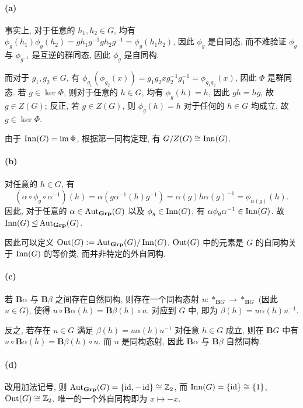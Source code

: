 \documentclass{article}
\begin{document}
\begin{solution}
	\paragraph{(a)} 事实上, 对于任意的 $h_1,h_2 \in G$, 均有 $\phi_g(h_1) \phi_g(h_2) = gh_1g^{-1} gh_2g^{-1} = \phi_g(h_1h_2)$, 因此 $\phi_g$ 是自同态, 而不难验证 $\phi_g$ 与 $\phi_{g^{-1}}$ 是互逆的群同态, 因此 $\phi_g$ 是自同构.

	而对于 $g_1, g_2 \in G$, 有 $\phi_{g_1}(\phi_{g_2}(x)) = g_1g_2xg_2^{-1}g_1^{-1} = \phi_{g_1g_2}(x)$, 因此 $\Phi$ 是群同态. 若 $g \in \ker \Phi$, 则对于任意的 $h \in G$, 均有 $\phi_g(h) = h$, 因此 $gh = hg$, 故 $g \in Z(G)$; 反正, 若 $g \in Z(G)$, 则 $\phi_g(h) = h$ 对于任何的 $h \in G$ 均成立, 故 $g \in \ker \Phi$. 

	由于 $\operatorname{Inn}(G) = \operatorname{im} \Phi$, 根据第一同构定理, 有 $G/Z(G) \cong \operatorname{Inn}(G)$. 

	\paragraph{(b)} 对任意的 $h \in G$, 有
	\[ (\alpha \circ \phi_g \circ \alpha^{-1})(h) = \alpha(g \alpha^{-1}(h) g^{-1}) = \alpha(g) h \alpha(g)^{-1} = \phi_{\alpha(g)}(h). \]
	因此, 对于任意的 $\alpha \in \operatorname{Aut}_{\mathbf{Grp}}(G)$ 以及 $\phi_g \in \operatorname{Inn}(G)$, 有 $\alpha \phi_g \alpha^{-1} \in \operatorname{Inn}(G)$. 故 $\operatorname{Inn}(G) \unlhd \operatorname{Aut}_{\mathbf{Grp}}(G)$. 

	因此可以定义 $\operatorname{Out}(G):= \operatorname{Aut}_{\mathbf{Grp}}(G)/\operatorname{Inn}(G)	$. $\operatorname{Out}(G)$ 中的元素是 $G$ 的自同构关于 $\operatorname{Inn}(G)$ 的等价类, 而并非特定的外自同构.

	\paragraph{(c)} 若 $\mathbf{B}\alpha$ 与 $\mathbf{B}\beta$ 之间存在自然同构, 则存在一个同构态射 $u: *_{\mathbf{B}G} \to *_{\mathbf{B}G}$ (因此 $u \in G$), 使得 $u \circ \mathbf{B}\alpha(h) = \mathbf{B}\beta(h) \circ u$. 对应到 $G$ 中, 即为 $\beta(h) = u \alpha(h) u^{-1}$. 
	
	反之, 若存在 $u \in G$ 满足 $\beta(h) = u \alpha(h) u^{-1}$ 对任意 $h \in G$ 成立, 则在 $\mathbf{B}G$ 中有 $u \circ \mathbf{B}\alpha(h) = \mathbf{B}\beta(h) \circ u$. 而 $u$ 是同构态射, 因此 $\mathbf{B}\alpha$ 与 $\mathbf{B}\beta$ 自然同构.

	\paragraph{(d)} 改用加法记号, 则 $\operatorname{Aut}_{\mathbf{Grp}}(G) = \{\operatorname{id}, -\operatorname{id}\} \cong \mathbb{Z}_2$, 而 $\operatorname{Inn}(G) = \{\operatorname{id}\} \cong \{1\}$, $\operatorname{Out}(G) \cong \mathbb{Z}_2$. 唯一的一个外自同构即为 $x \mapsto -x$. 
\end{solution}
\end{document}
